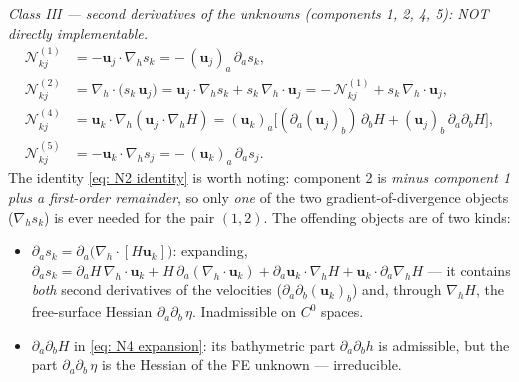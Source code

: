 \documentclass{article}
\newcommand{\uj}{\mathbf{u}_j}
\newcommand{\uk}{\mathbf{u}_k}
\newcommand{\nablah}{\nabla_h}
\begin{document}
\emph{Class III — second derivatives of the unknowns (components 1, 2, 4, 5): NOT directly implementable.}
\begin{subequations}
\begin{align}
    \mathcal{N}^{(1)}_{kj} &= -\uj\cdot\nablah s_k = -\,(\uj)_a\, \partial_a s_k ,\\
    \mathcal{N}^{(2)}_{kj} &= \nablah\cdot\big(s_k\,\uj\big) = \uj\cdot\nablah s_k + s_k\,\nablah\cdot\uj
        = -\,\mathcal{N}^{(1)}_{kj} + s_k\,\nablah\cdot\uj ,\label{eq: N2 identity}\\
    \mathcal{N}^{(4)}_{kj} &= \uk\cdot\nablah(\uj\cdot\nablah H)
        = (\uk)_a\Big[(\partial_a(\uj)_b)\,\partial_b H + (\uj)_b\,\partial_a\partial_b H\Big] ,\label{eq: N4 expansion}\\
    \mathcal{N}^{(5)}_{kj} &= -\uk\cdot\nablah s_j = -\,(\uk)_a\,\partial_a s_j .
\end{align}
\end{subequations}
The identity \eqref{eq: N2 identity} is worth noting: component 2 is \emph{minus component 1 plus a first-order remainder}, so only \emph{one} of the two gradient-of-divergence objects ($\nablah s_k$) is ever needed for the pair $(1,2)$. The offending objects are of two kinds:
\begin{itemize}
    \item $\partial_a s_k = \partial_a\big(\nablah\cdot[H\uk]\big)$: expanding, $\partial_a s_k = \partial_a H\, \nablah\cdot\uk + H\,\partial_a(\nablah\cdot\uk) + \partial_a\uk\cdot\nablah H + \uk\cdot\partial_a\nablah H$ — it contains \emph{both} second derivatives of the velocities ($\partial_a\partial_b (\uk)_b$) and, through $\nablah H$, the free-surface Hessian $\partial_a\partial_b\,\eta$. Inadmissible on $C^0$ spaces.
    \item $\partial_a\partial_b H$ in \eqref{eq: N4 expansion}: its bathymetric part $\partial_a\partial_b h$ is admissible, but the part $\partial_a\partial_b\,\eta$ is the Hessian of the FE unknown — irreducible.
\end{itemize}
\end{document}
